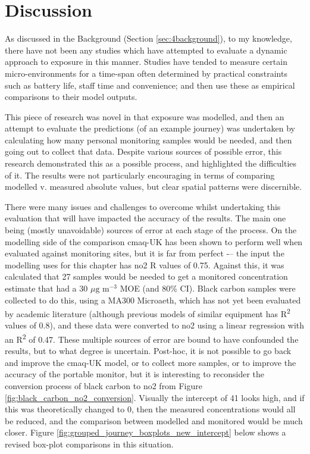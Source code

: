 \section{Discussion}
\label{sec:4Discussion}

As discussed in the Background (Section \ref{sec:4background}), to my knowledge, there have not been any studies which have attempted to evaluate a dynamic approach to exposure in this manner. Studies have tended to measure certain micro-environments for a time-span often determined by practical constraints such as battery life, staff time and convenience; and then use these as empirical comparisons to their model outputs.

This piece of research was novel in that exposure was modelled, and then an attempt to evaluate the predictions (of an example journey) was undertaken by calculating how many personal monitoring samples would be needed, and then going out to collect that data. Despite various sources of possible error, this research demonstrated this as a possible process, and highlighted the difficulties of it. The results were not particularly encouraging in terms of comparing modelled v. measured absolute values, but clear spatial patterns were discernible. 

There were many issues and challenges to overcome whilst undertaking this evaluation that will have impacted the accuracy of the results. The main one being (mostly unavoidable) sources of error at each stage of the process. On the modelling side of the comparison \gls{cmaq}-UK has been shown to perform well when evaluated against monitoring sites, but it is far from perfect -– the input the modelling uses for this chapter has \gls{no2} R values of 0.75. Against this, it was calculated that 27 samples would be needed to get a monitored concentration estimate that had a 30 $\mu \text{g m}^{-3}$ MOE (and 80\% CI). Black carbon samples were collected to do this, using a MA300 Microaeth, which has not yet been evaluated by academic literature (although previous models of similar equipment has R\textsuperscript{2} values of 0.8), and these data were converted to \gls{no2} using a linear regression with an R\textsuperscript{2} of 0.47. These multiple sources of error are bound to have confounded the results, but to what degree is uncertain. Post-hoc, it is not possible to go back and improve the \gls{cmaq}-UK model, or to collect more samples, or to improve the accuracy of the portable monitor, but it is interesting to reconsider the conversion process of black carbon to \gls{no2} from Figure \ref{fig:black_carbon_no2_conversion}. Visually the intercept of 41 looks high, and if this was theoretically changed to 0, then the measured concentrations would all be reduced, and the comparison between modelled and monitored would be much closer. Figure \ref{fig:grouped_journey_boxplots_new_intercept} below shows a revised box-plot comparisons in this situation.

